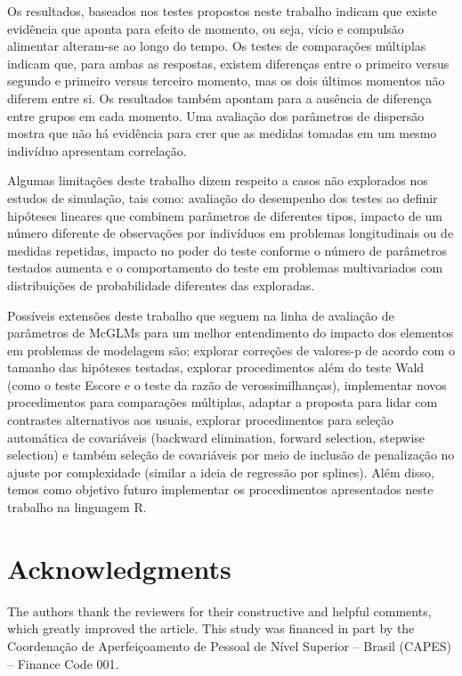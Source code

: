 \documentclass[AMA,STIX1COL]{WileyNJD-v2}
\begin{document}
Os resultados, baseados nos testes propostos neste trabalho indicam que existe evidência que aponta para efeito de momento, ou seja, vício e compulsão alimentar alteram-se ao longo do tempo. Os testes de comparações múltiplas indicam que, para ambas as respostas, existem diferenças entre o primeiro versus segundo e primeiro versus terceiro momento, mas os dois últimos momentos não diferem entre si. Os resultados também apontam para a ausência de diferença entre grupos em cada momento. Uma avaliação dos parâmetros de dispersão mostra que não há evidência para crer que as medidas tomadas em um mesmo indivíduo apresentam correlação.

Algumas limitações deste trabalho dizem respeito a casos não explorados nos estudos de simulação, tais como: avaliação do desempenho dos testes ao definir hipóteses lineares que combinem parâmetros de diferentes tipos, impacto de um número diferente de observações por indivíduos em problemas longitudinais ou de medidas repetidas, impacto no poder do teste conforme o número de parâmetros testados aumenta e o comportamento do teste em problemas multivariados com distribuições de probabilidade diferentes das exploradas.

Possíveis extensões deste trabalho que seguem na linha de avaliação de parâmetros de McGLMs para um melhor entendimento do impacto dos elementos em problemas de modelagem são: explorar correções de valores-p de acordo com o tamanho das hipóteses testadas, explorar procedimentos além do teste Wald (como o teste Escore e o teste da razão de verossimilhanças), implementar novos procedimentos para comparações múltiplas, adaptar a proposta para lidar com contrastes alternativos aos usuais, explorar procedimentos para seleção automática de covariáveis (backward elimination, forward selection, stepwise selection) e também seleção de covariáveis por meio de inclusão de penalização no ajuste por complexidade (similar a ideia de regressão por splines). Além disso, temos como objetivo futuro implementar os procedimentos apresentados neste trabalho na linguagem R.



\section*{Acknowledgments}

The authors thank the reviewers for their constructive and helpful comments, which greatly improved the article. This study was financed in part by the Coordenação de Aperfeiçoamento de Pessoal de Nível Superior – Brasil (CAPES) – Finance Code 001.
\end{document}
